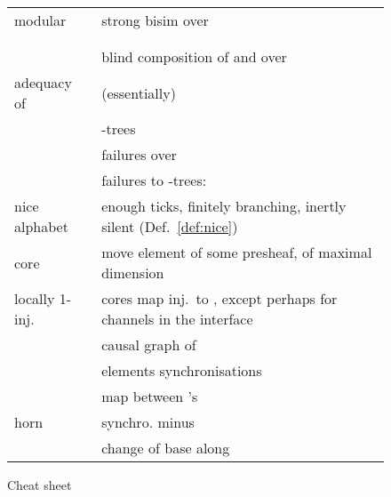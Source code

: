 \documentclass{LMCS}
\theoremstyle{plain}\newtheorem{satz}[thm]{Satz}
\begin{document}
\begin{figure}[p]
\begin{multicols}{2}
\begin{tabular}{lp{.7\linewidth}}
         modular &   strong bisim over  \\
        
         &  \\
         &  \\

         & blind composition of  and  over  \\
        \begin{minipage}[t]{.2\linewidth}
        adequacy of 
        \end{minipage} &
        (essentially)  \\
        
         & -trees \\
         & failures over  \\
         & failures to -trees:  \\
        nice alphabet & enough ticks, finitely branching, inertly silent 
        (Def.~\ref{def:nice}) \\
        
        core & move element of some presheaf, of maximal dimension \\
         locally 1-inj. & cores map inj.\ to , except 
        perhaps for channels in the interface  \\
         & causal graph of  \\
         & elements  synchronisations \\
         & map between 's \\
        horn  & synchro. minus  \\
         & change of base along 
      \end{tabular}
    \end{multicols}
    \caption{Cheat sheet}
\label{fig:cheat}
\end{figure}
\end{document}
